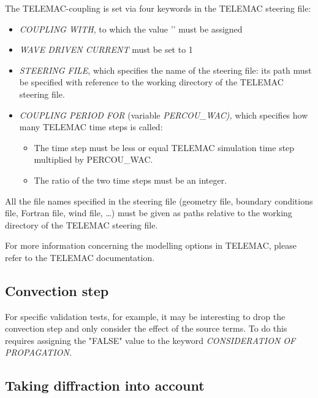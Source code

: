  The TELEMAC-\tomawac coupling is set via four keywords in the TELEMAC steering file:

\begin{itemize}
\item  \textit{COUPLING WITH}, to which the value '\tomawac' must be assigned

\item  \textit{WAVE DRIVEN CURRENT} must be set to 1

\item  \textit{\tomawac STEERING FILE}, which specifies the name of the \tomawac steering file: its path must be specified with
  reference to the working directory of the TELEMAC steering file.

\item  \textit{COUPLING PERIOD FOR \tomawac} (variable \textit{PERCOU\_WAC),} which specifies how many TELEMAC time steps \tomawac
  is called:

\begin{itemize}
\item  The \tomawac time step must be less or equal TELEMAC simulation time step multiplied by PERCOU\_WAC.

\item  The ratio of the two time steps must be an integer.
\end{itemize}
\end{itemize}

All the file names specified in the \tomawac steering file (geometry file, boundary conditions file, Fortran file, wind file,
\dots ) must be given as paths relative to the working directory of the TELEMAC steering file.

 For more information concerning the modelling options in TELEMAC, please refer to the TELEMAC documentation.

\subsection{ Convection step}

For specific validation tests, for example, it may be interesting to drop the convection step and only consider the effect of the
source terms. To do this requires assigning the "FALSE" value to the keyword \textit{CONSIDERATION OF PROPAGATION}.


\subsection{ Taking diffraction into account}

